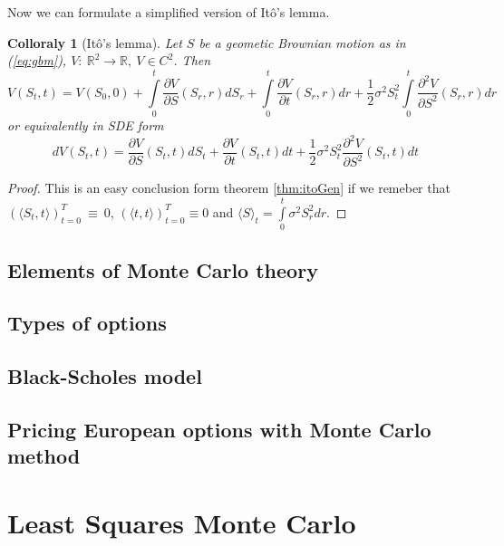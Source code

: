 \documentclass[a4paper,12pt]{article}
\newtheorem{coll}[thm]{Colloraly}
\theoremstyle{definition}
\theoremstyle{remark}
\begin{document}
\noindent Now we can formulate a simplified version of It\^{o}'s lemma.
\begin{coll}[It\^{o}'s lemma]
  Let $S$ be a geometic Brownian motion as in (\ref{eq:gbm}), $V:\ \mathbb{R}^2 \rightarrow \mathbb{R},\ V \in C^2$. Then 
  \begin{equation*}
   V(S_t, t) = V(S_0, 0) + \int\limits_0^t \frac{\partial V}{\partial S}(S_r,r)dS_r + \int\limits_0^t \frac{\partial V}{\partial t}(S_r,r)dr + \frac{1}{2}\sigma^2 S_t^2 \int\limits_0^t \frac{\partial^2 V}{\partial S^2}(S_r,r)dr
  \end{equation*}
  or equivalently in SDE form
  \begin{equation}
   dV(S_t, t) = \frac{\partial V}{\partial S}(S_t,t)dS_t + \frac{\partial V}{\partial t}(S_t,t)dt + \frac{1}{2}\sigma^2 S_t^2 \frac{\partial^2 V}{\partial S^2}(S_t,t)dt   
  \end{equation}  
\end{coll}
\begin{proof}
This is an easy conclusion form theorem \ref{thm:itoGen} if we remeber that $(\langle S_t, t\rangle)_{t=0}^T~\equiv~0$, $(\langle t, t\rangle)_{t=0}^T \equiv 0$ and $\langle S\rangle_t = \int\limits_0^t \sigma^2 S_r^2 dr$.
\end{proof}



\subsection{Elements of Monte Carlo theory}
\subsection{Types of options}
\subsection{Black-Scholes model}
\subsection{Pricing European options with Monte Carlo method}
\newpage
\section{Least Squares Monte Carlo}
\end{document}
